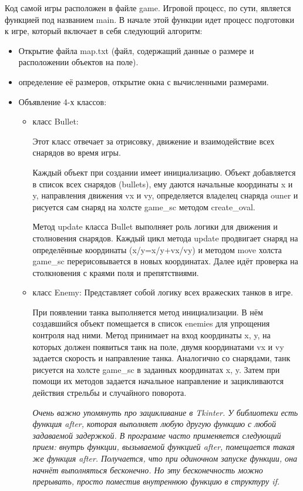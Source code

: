 Код самой игры расположен в файле game. Игровой процесс, по сути, является функцией под названием main. В начале этой функции идет процесс подготовки к игре, который включает в себя следующий алгоритм:
\begin{itemize}
\item Открытие файла map.txt (файл, содержащий данные о размере и расположении объектов на поле).
\item определение её размеров, открытие окна с вычисленными размерами.
\item Объявление 4-х классов:
    \begin{itemize}
    \item класс Bullet:

    Этот класс отвечает за отрисовку, движение и взаимодействие всех снарядов во время игры.
    
    Каждый объект при создании имеет инициализацию. Объект добавляется в список всех снарядов (bullets), ему даются начальные координаты x и y, направления движения vx и vy, определяется владелец снаряда ouner и рисуется сам снаряд на холсте game\_sc методом create\_oval.

    Метод update класса Bullet выполняет роль логики для движения и столновения снарядов. Каждый цикл метода update продвигает снаряд на определённые координаты (x/y=x/y+vx/vy) и методом move холста game\_sc перерисовывается в новых координатах. Далее идёт проверка на столкновения с краями поля и препятствиями.

    \item класс Enemy:
    Представляет собой логику всех вражеских танков в игре.
    
    При появлении танка выполняется метод инициализации. В нём создавшийся объект помещается в список enemies для упрощения контроля над ними. Метод принимает на вход координаты x, y, на которых должен появиться танк на поле, двумя координатами vx и vy задается скорость и направление танка. Аналогично со снарядами, танк рисуется на холсте game\_sc в заданных координатах x, y. Затем при помощи их методов задается начальное направление и зацикливаются действия стрельбы и случайного поворота.
    
    \textit{
    Очень важно упомянуть про зацикливание в Tkinter. У библиотеки есть функция after, которая выполняет любую другую функцию с любой задаваемой задержкой. В программе часто применяется следующий прием: внутрь функции, вызываемой функцией after, помещается такая же функция after. Получается, что при одиночном запуске функции, она начнёт выполняться бесконечно. Но эту бесконечность можно прерывать, просто поместив внутреннюю функцию в структуру if.}


\end{itemize}
\end{itemize}
